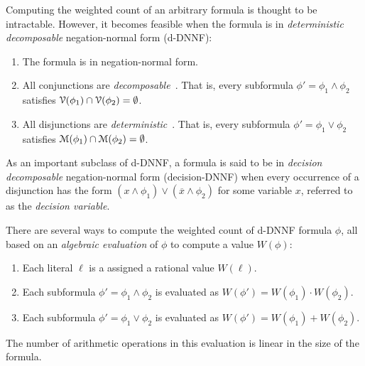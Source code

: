 \documentclass[letterpaper,USenglish,cleveref, autoref, thm-restate]{lipics-v2021}
\newcommand{\obar}[1]{\overline{#1}}
\newcommand{\lit}{\ell}
\newcommand{\dependencyset}{{\cal V}}
\newcommand{\modelset}{{\cal M}}
\begin{document}
Computing the weighted count of an arbitrary formula is thought to be intractable.  However, it becomes
feasible when the formula is in \emph{deterministic decomposable} negation-normal form (d-DNNF):
\begin{enumerate}
\item The formula is in negation-normal form.  
\item All conjunctions are \emph{decomposable}~\cite{darwiche:jacm:2001,darwiche:jair:2002}.  That is, every subformula $\phi' = \phi_1 \land \phi_2$
  satisfies $\dependencyset(\phi_1) \cap \dependencyset(\phi_2) = \emptyset$.
\item All disjunctions are \emph{deterministic}~\cite{darwiche:jancl:2001,darwiche:jair:2002}.  That is, every subformula $\phi' = \phi_1 \lor \phi_2$ satisfies
  $\modelset(\phi_1) \cap \modelset(\phi_2) = \emptyset$.
\end{enumerate}
As an important subclass of d-DNNF, a formula is said to be in 
\emph{decision decomposable} negation-normal form (decision-DNNF) when every occurrence of a disjunction has the form 
$(x \land \phi_1) \lor (\obar{x} \land \phi_2)$ for some variable $x$, referred to as the \emph{decision variable}.

There are several ways to compute the weighted count of d-DNNF formula $\phi$, all
based on an \emph{algebraic evaluation} of $\phi$ to compute a value $W(\phi)$:
\begin{enumerate}
\item Each literal $\lit$ is a assigned a rational value $W(\lit)$.
\item Each subformula $\phi' = \phi_1 \land \phi_2$ is evaluated as $W(\phi') = W(\phi_1) \cdot W(\phi_2)$.
\item Each subformula $\phi' = \phi_1 \lor \phi_2$ is evaluated as $W(\phi') = W(\phi_1) + W(\phi_2)$.
\end{enumerate}
The number of arithmetic operations in this evaluation is linear in the size of the formula.
\end{document}
